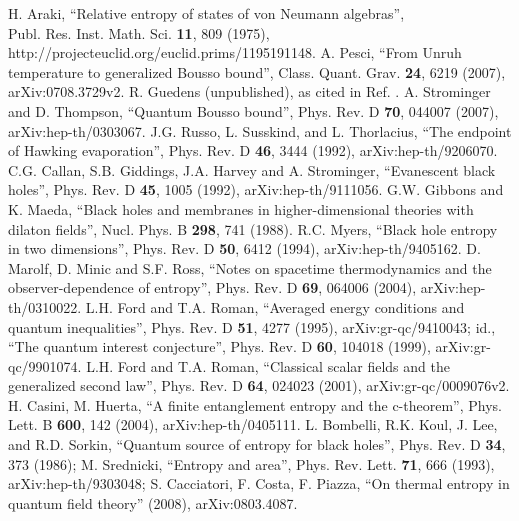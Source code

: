 \documentclass[12pt]{article}
\begin{document}
\begin{thebibliography}{99}
H. Araki, ``Relative entropy of states of von Neumann algebras'', \\Publ. Res. Inst. Math. Sci. \textbf{11}, 809 (1975), \\http://projecteuclid.org/euclid.prims/1195191148.
A. Pesci, ``From Unruh temperature to generalized Bousso bound'', Class. Quant. Grav. \textbf{24}, 6219 (2007), arXiv:0708.3729v2.
R. Guedens (unpublished), as cited in Ref. \cite{BFM03}.
A. Strominger and D. Thompson, ``Quantum Bousso bound'', Phys. Rev. D \textbf{70}, 044007 (2007), arXiv:hep-th/0303067.
J.G. Russo, L. Susskind, and L. Thorlacius, ``The endpoint of Hawking evaporation'', Phys. Rev. D \textbf{46}, 3444 (1992), arXiv:hep-th/9206070.
C.G. Callan, S.B. Giddings, J.A. Harvey and A. Strominger, ``Evanescent black holes'', Phys. Rev. D \textbf{45}, 1005 (1992), arXiv:hep-th/9111056.
G.W. Gibbons and K. Maeda, ``Black holes and membranes in higher-dimensional theories with dilaton fields'', Nucl. Phys. B \textbf{298}, 741 (1988).
R.C. Myers, ``Black hole entropy in two dimensions'', Phys. Rev. D \textbf{50}, 6412 (1994), arXiv:hep-th/9405162.
D. Marolf, D. Minic and S.F. Ross, ``Notes on spacetime thermodynamics and the observer-dependence of entropy'', Phys. Rev. D \textbf{69}, 064006 (2004), arXiv:hep-th/0310022.
L.H. Ford and T.A. Roman, ``Averaged energy conditions and quantum inequalities'', Phys. Rev. D \textbf{51}, 4277 (1995), arXiv:gr-qc/9410043; id., ``The quantum interest conjecture'', Phys. Rev. D \textbf{60}, 104018 (1999), arXiv:gr-qc/9901074.
L.H. Ford and T.A. Roman, ``Classical scalar fields and the generalized second law'', Phys. Rev. D \textbf{64}, 024023 (2001), arXiv:gr-qc/0009076v2.
H. Casini, M. Huerta, ``A finite entanglement entropy and the c-theorem'', Phys. Lett. B \textbf{600}, 142 (2004), arXiv:hep-th/0405111.
L. Bombelli, R.K. Koul, J. Lee, and R.D. Sorkin, ``Quantum source of entropy for black holes'', Phys. Rev. D \textbf{34}, 373 (1986); M. Srednicki, ``Entropy and area'', Phys. Rev. Lett. \textbf{71}, 666 (1993), arXiv:hep-th/9303048; S. Cacciatori, F. Costa, F. Piazza,  ``On thermal entropy in quantum field theory'' (2008), arXiv:0803.4087.
\end{thebibliography}
\end{document}
